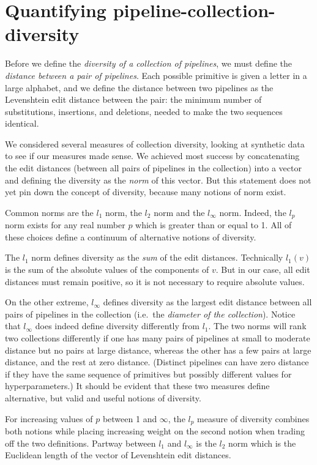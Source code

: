 \documentclass{article}
\begin{document}
\section{Quantifying pipeline-collection-diversity}
  Before we define the \emph{diversity of a collection of pipelines},
  we must define the \emph{distance between a pair of pipelines}.
  Each possible primitive is given a letter in a large alphabet, and
  we define the distance between two pipelines as the Levenshtein edit
  distance between the pair: the minimum number of substitutions,
  insertions, and deletions, needed to make the two sequences
  identical.

  We considered several measures of collection diversity, looking at
  synthetic data to see if our measures made sense.  We achieved most
  success by concatenating the edit distances (between all pairs of
  pipelines in the collection) into a vector and defining the
  diversity as the \emph{norm} of this vector.  But this statement
  does not yet pin down the concept of diversity, because many notions
  of norm exist.

  Common norms are the $l_1$ norm, the $l_2$ norm and the $l_\infty$
  norm.  Indeed, the $l_p$ norm exists for any real number $p$ which
  is greater than or equal to 1.  All of these choices define a
  continuum of alternative notions of diversity.

  The $l_1$ norm defines diversity as the \emph{sum} of the edit
  distances.  Technically $l_1(v)$ is the sum of the absolute values
  of the components of $v$.  But in our case, all edit distances must
  remain positive, so it is not necessary to require absolute values.

  On the other extreme, $l_\infty$ defines diversity as the largest
  edit distance between all pairs of pipelines in the collection
  (i.e.\ the \emph{diameter of the collection}).  Notice that
  $l_\infty$ does indeed define diversity differently from $l_1$.  The
  two norms will rank two collections differently if one has many
  pairs of pipelines at small to moderate distance but no pairs at
  large distance, whereas the other has a few pairs at large distance,
  and the rest at zero distance.  (Distinct pipelines can have zero
  distance if they have the same sequence of primitives but possibly
  different values for hyperparameters.)  It should be evident that
  these two measures define alternative, but valid and useful notions
  of diversity.

  For increasing values of $p$ between 1 and $\infty$, the $l_p$
  measure of diversity combines both notions while placing increasing
  weight on the second notion when trading off the two definitions.
  Partway between $l_1$ and $l_\infty$ is the $l_2$ norm which is the
  Euclidean length of the vector of Levenshtein edit distances.
\end{document}
